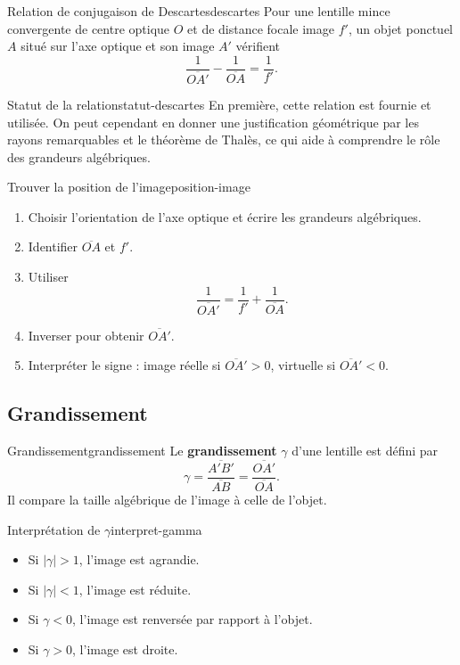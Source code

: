 \documentclass[11pt,a4paper]{article}
\begin{document}
\begin{theorembox}{Relation de conjugaison de Descartes}{descartes}
Pour une lentille mince convergente de centre optique $O$ et de distance focale image $f'$, un objet ponctuel $A$ situé sur l'axe optique et son image $A'$ vérifient
\[
\boxed{\frac{1}{\overline{OA'}}-\frac{1}{\overline{OA}}=\frac{1}{f'}}.
\]
\end{theorembox}

\begin{remarquebox}{Statut de la relation}{statut-descartes}
En première, cette relation est fournie et utilisée. On peut cependant en donner une justification géométrique par les rayons remarquables et le théorème de Thalès, ce qui aide à comprendre le rôle des grandeurs algébriques.
\end{remarquebox}

\begin{methodbox}{Trouver la position de l'image}{position-image}
\begin{enumerate}[label=\arabic*)]
  \item Choisir l'orientation de l'axe optique et écrire les grandeurs algébriques.
  \item Identifier $\overline{OA}$ et $f'$.
  \item Utiliser
  \[
  \frac{1}{\overline{OA'}}=\frac{1}{f'}+\frac{1}{\overline{OA}}.
  \]
  \item Inverser pour obtenir $\overline{OA'}$.
  \item Interpréter le signe : image réelle si $\overline{OA'}>0$, virtuelle si $\overline{OA'}<0$.
\end{enumerate}
\end{methodbox}

\subsection{Grandissement}

\begin{definitionbox}{Grandissement}{grandissement}
Le \textbf{grandissement} $\gamma$ d'une lentille est défini par
\[
\boxed{\gamma=\frac{\overline{A'B'}}{\overline{AB}}=\frac{\overline{OA'}}{\overline{OA}}}.
\]
Il compare la taille algébrique de l'image à celle de l'objet.
\end{definitionbox}

\begin{propositionbox}{Interprétation de $\gamma$}{interpret-gamma}
\begin{itemize}
  \item Si $|\gamma|>1$, l'image est agrandie.
  \item Si $|\gamma|<1$, l'image est réduite.
  \item Si $\gamma<0$, l'image est renversée par rapport à l'objet.
  \item Si $\gamma>0$, l'image est droite.
\end{itemize}
\end{propositionbox}
\end{document}
